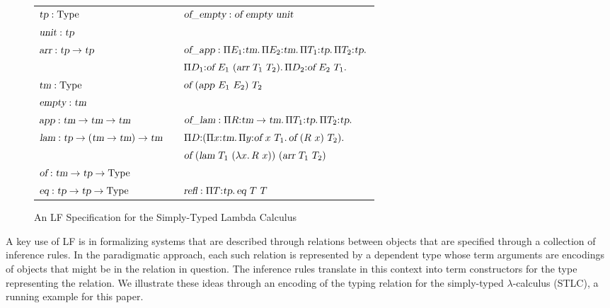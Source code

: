 \begin{figure*}[htbp]
\begin{tabular}{lcl}
  $\mbox{\sl tp}:\mbox{Type}$
  & \qquad & 
  $\mbox{\sl of\_empty}:\mbox{\sl of}\ \mbox{\sl empty}\ \mbox{\sl unit}$

  \\
  
  $\mbox{\sl unit}:\mbox{\sl tp}$
  & &

  \\

  $\mbox{\sl arr}:\mbox{\sl tp}\rightarrow \mbox{\sl tp}$
  & &
  $\mbox{\sl of\_app}:\Pi {E_1}{:}{\mbox{\sl tm}}.{\mkern 3mu} \Pi {E_2}{:}{\mbox{\sl tm}}.{\mkern 3mu} \Pi {T_1}{:}{\mbox{\sl tp}}.{\mkern 3mu} \Pi {T_2}{:}{\mbox{\sl tp}}.{\mkern 3mu}$
  \\
  & &
    \qquad
    $\Pi {D_1}{:}{\mbox{\sl of}\ E_1\ (\mbox{\sl arr}\ T_1\ T_2)}.{\mkern 3mu} 
       \Pi {D_2}{:}{\mbox{\sl of}\ E_2\ T_1}.{\mkern 3mu}$

  \\

  $\mbox{\sl tm}:\mbox{Type}$
  & &
  \qquad $\mbox{\sl of}\ (\mbox{\sl app}\  E_1\  E_2)\  T_2$

  \\

  $\mbox{\sl empty}:\mbox{\sl tm}$
  & &
  \\

  $\mbox{\sl app}:\mbox{\sl tm}\rightarrow \mbox{\sl tm}\rightarrow \mbox{\sl tm}$ & &
    $\mbox{\sl of\_lam}:\Pi {R}{:}{\mbox{\sl tm}\rightarrow \mbox{\sl tm}}.{\mkern 3mu} \Pi {T_1}{:}{\mbox{\sl tp}}.{\mkern 3mu} \Pi {T_2}{:}{\mbox{\sl tp}}.{\mkern 3mu}$
  \\

  $\mbox{\sl lam}:\mbox{\sl tp}\rightarrow (\mbox{\sl tm}\rightarrow \mbox{\sl tm})\rightarrow \mbox{\sl tm}$
  &  & 
  \qquad $\Pi {D}{:}{(\Pi {x}{:}{\mbox{\sl tm}}.{\mkern 3mu} \Pi {y}{:}{\mbox{\sl of}\ x\ T_1}.{\mkern 3mu} \mbox{\sl of}\ (R\ x)\ T_2)}.{\mkern 3mu}$
  \\
  
  & & \qquad $\mbox{\sl of}\ (\mbox{\sl lam}\  T_1\ (\lambda {x}.{\mkern 3mu} R\  x))
                              \ (\mbox{\sl arr}\  T_1\  T_2)$
  \\

  $\mbox{\sl of}:\mbox{\sl tm}\rightarrow \mbox{\sl tp}\rightarrow \mbox{Type}$ & & \\  

  $\mbox{\sl eq}:\mbox{\sl tp}\rightarrow \mbox{\sl tp}\rightarrow \mbox{Type}$ & &
    $\mbox{\sl refl}:\Pi {T}{:}{\mbox{\sl tp}}.{\mkern 3mu} \mbox{\sl eq}\  T\  T$
\end{tabular}
\caption{An LF Specification for the Simply-Typed Lambda Calculus}
\label{fig:stlc-term-spec}
\end{figure*}

A key use of LF is in formalizing systems that are described 
through relations between objects that are specified through a
collection of inference rules. 
%
In the paradigmatic approach, each such relation is represented by a
dependent type whose term arguments are encodings of objects that
might be in the relation in question.
%
The inference rules translate in this context into term constructors
for the type representing the relation.
%
We illustrate these ideas through an encoding of the typing relation
for the simply-typed $\lambda$-calculus (STLC), a running example for this
paper. 

